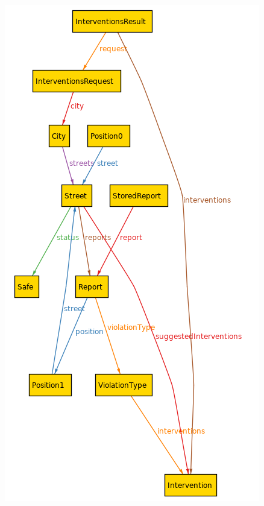 	\begin{figure}[h!]
		\centering
		\includegraphics[scale=0.6]{Files/alloy/world3.png}
	\end{figure}
	